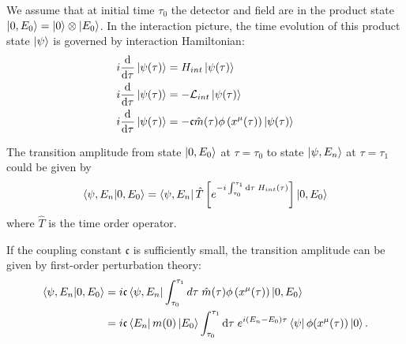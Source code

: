 \documentclass[12pt]{article}
\numberwithin{equation}{section}
\theoremstyle{1style}
\newcommand{\id}{\mathrm{d}}
\begin{document}
We assume that at initial time \(\tau_0\) the detector and field are in the product state \(\ket{0,E_0}=\ket{0}\otimes\ket{E_0}\).
In the interaction picture, the time evolution of this product state \(\ket{\psi}\) is governed by interaction Hamiltonian:
\begin{align}
  i\frac{\id }{\id \tau}\ket{\psi(\tau)} & =H_{int}\ket{\psi(\tau)}                                                   \\
  i\frac{\id }{\id \tau}\ket{\psi(\tau)} & =-\mathcal{L}_{int}\ket{\psi(\tau)}                                        \\
  i\frac{\id }{\id \tau}\ket{\psi(\tau)} & =-\mathfrak{c} \hat{m}(\tau)\phi\left(x^{\mu}(\tau)\right)\ket{\psi(\tau)}
\end{align}

The transition amplitude from state \(\ket{0,E_0}\) at \(\tau=\tau_0\)
to state \(\ket{\psi,E_n}\) at \(\tau=\tau_1\) could be given by
\begin{equation}
  \braket{\psi,E_n}{0,E_0}=\bra{\psi,E_n}\hat{T}\left[e^{-i\int_{\tau_0}^{\tau_1}\id \tau\;H_{int}(\tau)}\right]\ket{0,E_0}
\end{equation}
where \(\hat{T}\) is the time order operator.

If the coupling constant \(\mathfrak{c}\) is sufficiently small, the transition amplitude can be given by first-order perturbation theory:
\begin{align}\label{TA1}
  \braket{\psi,E_n}{0,E_0} & =i\mathfrak{c} \bra{\psi,E_n}\int_{\tau_0}^{\tau_1}d\tau\;
  \hat{m}(\tau)\phi\left(x^{\mu}(\tau)\right)\ket{0,E_{0}}                                                                                               \\
                           & =i\mathfrak{c}\bra{E_n}m(0)\ket{E_0}\int_{\tau_0}^{\tau_1}\id \tau\;e^{i(E_n-E_0)\tau}\bra{\psi}\phi(x^{\mu}(\tau))\ket{0}.
\end{align}
\end{document}
